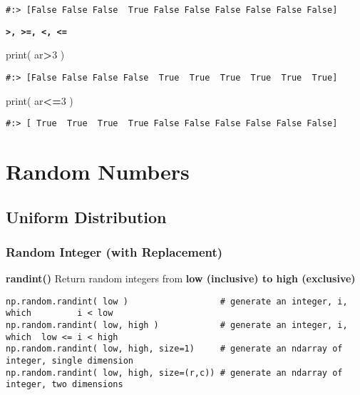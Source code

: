 \documentclass[
]{book}
\newenvironment{Shaded}{\begin{snugshade}}{\end{snugshade}}
\newcommand{\BuiltInTok}[1]{#1}
\newcommand{\DecValTok}[1]{\textcolor[rgb]{0.06,0.06,0.06}{#1}}
\newcommand{\NormalTok}[1]{#1}
\newcommand{\OperatorTok}[1]{\textcolor[rgb]{0.43,0.43,0.43}{\textbf{#1}}}
\begin{document}
\begin{verbatim}
#:> [False False False  True False False False False False False]
\end{verbatim}

\textbf{\texttt{\textgreater{},\ \textgreater{}=,\ \textless{},\ \textless{}=}}

\begin{Shaded}
\begin{Highlighting}[]
\BuiltInTok{print}\NormalTok{( ar}\OperatorTok{\textgreater{}}\DecValTok{3}\NormalTok{ )}
\end{Highlighting}
\end{Shaded}

\begin{verbatim}
#:> [False False False False  True  True  True  True  True  True]
\end{verbatim}

\begin{Shaded}
\begin{Highlighting}[]
\BuiltInTok{print}\NormalTok{( ar}\OperatorTok{\textless{}=}\DecValTok{3}\NormalTok{ )}
\end{Highlighting}
\end{Shaded}

\begin{verbatim}
#:> [ True  True  True  True False False False False False False]
\end{verbatim}

\hypertarget{random-numbers}{%
\section{Random Numbers}\label{random-numbers}}

\hypertarget{uniform-distribution}{%
\subsection{Uniform Distribution}\label{uniform-distribution}}

\hypertarget{random-integer-with-replacement}{%
\subsubsection{Random Integer (with Replacement)}\label{random-integer-with-replacement}}

\textbf{randint()} Return random integers from \textbf{low (inclusive) to high (exclusive)}

\begin{verbatim}
np.random.randint( low )                  # generate an integer, i, which         i < low
np.random.randint( low, high )            # generate an integer, i, which  low <= i < high
np.random.randint( low, high, size=1)     # generate an ndarray of integer, single dimension
np.random.randint( low, high, size=(r,c)) # generate an ndarray of integer, two dimensions 
\end{verbatim}
\end{document}
